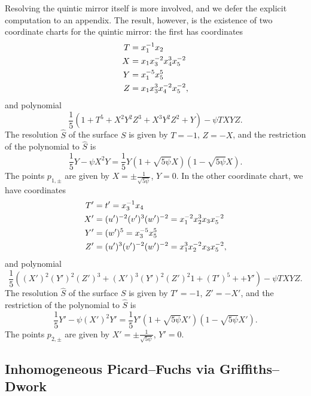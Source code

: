Resolving the quintic mirror itself is more involved, and we defer the
explicit computation to an appendix.  The result, however, is the
existence of two coordinate charts for the quintic mirror: the first
has coordinates
\begin{equation}
\eqlabel{patch1}
\begin{split} 
T &= x_1^{-1}x_2\\
X &= x_1x_3^{-2}x_4^3x_5^{-2}\\
Y &= x_1^{-5}x_5^5\\
Z &= x_1x_3^3x_4^{-2}x_5^{-2},
\end{split}
\end{equation}
and polynomial
\[ \frac15\left(1+T^5
+X^2 Y^2 Z^{3}
+X^{3} Y^2 Z^{2}
+ Y
\right)-\psi TXYZ.
\]
The resolution $\widehat{S}$ of the surface $S$ is given by $T=-1$,
$Z=-X$, and the restriction of the polynomial to $\widehat{S}$ is
\[ \frac15Y-\psi X^2Y=\frac15Y(1+\sqrt{5\psi}X)(1-\sqrt{5\psi}X).
\]
The points $p_{1,\pm}$ are given by $X=\pm\frac1{\sqrt{5\psi}}$, $Y=0$.
In the other coordinate chart, we have coordinates
\begin{equation}
\eqlabel{patch2}
\begin{split}
T' &= t' = x_3^{-1}x_4\\
X' &= (u')^{-2}(v')^{3}(w')^{-2} = x_1^{-2}x_2^3x_3x_5^{-2}\\
Y' &= (w')^{5} = x_3^{-5}x_5^5\\
Z' &= (u')^{3}(v')^{-2}(w')^{-2} = x_1^3x_2^{-2}x_3x_5^{-2},
\end{split}
\end{equation}
and polynomial
\[ \frac15\left(
(X')^2 (Y')^2 (Z')^{3}+(X')^{3} (Y')^2 (Z')^{2}
1+(T')^5+
+ Y'
\right)-\psi TXYZ.
\]
The resolution $\widehat{S}$ of the surface $S$ is given by $T'=-1$,
$Z'=-X'$, and the restriction of the polynomial to $\widehat{S}$ is
\[ \frac15Y'-\psi (X')^2Y'=\frac15Y'(1+\sqrt{5\psi}X')(1-\sqrt{5\psi}X').
\]
The points $p_{2,\pm}$ are given by $X'=\pm\frac1{\sqrt{5\psi}}$, $Y'=0$.


\subsection{Inhomogeneous Picard--Fuchs via Griffiths--Dwork}
\label{key}

